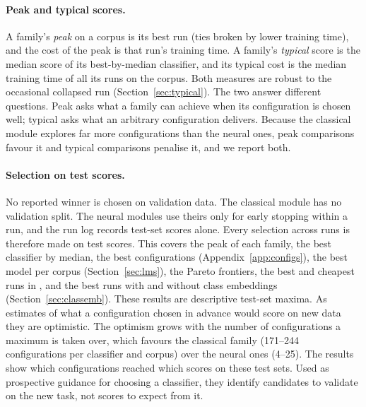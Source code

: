\documentclass{ijis}
\begin{document}
\paragraph{Peak and typical scores.} A family's \emph{peak} on a corpus is its best run (ties broken by lower training time), and the cost of the peak is that run's training time. A family's \emph{typical} score is the median score of its best-by-median classifier, and its typical cost is the median training time of all its runs on the corpus. Both measures are robust to the occasional collapsed run (Section~\ref{sec:typical}). The two answer different questions. Peak asks what a family can achieve when its configuration is chosen well; typical asks what an arbitrary configuration delivers. Because the classical module explores far more configurations than the neural ones, peak comparisons favour it and typical comparisons penalise it, and we report both.

\paragraph{Selection on test scores.} No reported winner is chosen on validation data. The classical module has no validation split. The neural modules use theirs only for early stopping within a run, and the run log records test-set scores alone. Every selection across runs is therefore made on test scores. This covers the peak of each family, the best classifier by median, the best configurations (Appendix~\ref{app:configs}), the best model per corpus (Section~\ref{sec:lms}), the Pareto frontiers, the best and cheapest runs in , and the best runs with and without class embeddings (Section~\ref{sec:classemb}). These results are descriptive test-set maxima. As estimates of what a configuration chosen in advance would score on new data they are optimistic. The optimism grows with the number of configurations a maximum is taken over, which favours the classical family (171--244 configurations per classifier and corpus) over the neural ones (4--25). The results show which configurations reached which scores on these test sets. Used as prospective guidance for choosing a classifier, they identify candidates to validate on the new task, not scores to expect from it.
\end{document}
